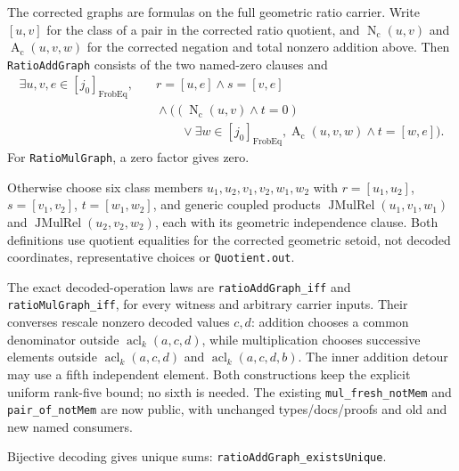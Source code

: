 \documentclass[11pt,oneside]{article}
\theoremstyle{definition}
\theoremstyle{remark}
\newcommand{\acl}{\operatorname{acl}}
\newcommand{\lean}[1]{\nolinkurl{#1}}
\begin{document}
The corrected graphs are formulas on the full geometric ratio carrier.
Write $[u,v]$ for the class of a pair in the corrected ratio quotient, and
$\operatorname{N}_{\mathrm c}(u,v)$ and $\operatorname{A}_{\mathrm c}(u,v,w)$
for the corrected negation and total nonzero addition above. Then
\lean{RatioAddGraph} consists of the two named-zero clauses and
\[
\begin{split}
\exists u,v,e\in[j_0]_{\operatorname{FrobEq}},\quad&
 r=[u,e]\land s=[v,e]\\
&{}\land\bigl((\operatorname{N}_{\mathrm c}(u,v)\land t=0)\\
&\qquad{}\lor\exists w\in[j_0]_{\operatorname{FrobEq}},
       \operatorname{A}_{\mathrm c}(u,v,w)\land t=[w,e]\bigr).
\end{split}
\]
For \lean{RatioMulGraph}, a zero factor gives zero.

Otherwise choose six class members $u_1,u_2,v_1,v_2,w_1,w_2$ with
$r=[u_1,u_2]$, $s=[v_1,v_2]$, $t=[w_1,w_2]$, and generic coupled products
$\operatorname{JMulRel}(u_1,v_1,w_1)$ and
$\operatorname{JMulRel}(u_2,v_2,w_2)$, each with its geometric independence clause.
Both definitions use quotient equalities for the corrected geometric setoid,
not decoded coordinates, representative choices or \lean{Quotient.out}.

The exact decoded-operation laws are \lean{ratioAddGraph_iff} and
\lean{ratioMulGraph_iff}, for every witness and arbitrary carrier inputs.
Their converses rescale nonzero decoded values $c,d$:
addition chooses a common denominator outside $\acl_k(a,c,d)$, while
multiplication chooses successive elements outside $\acl_k(a,c,d)$ and
$\acl_k(a,c,d,b)$. The inner addition detour may use a fifth independent element.
Both constructions keep the explicit uniform rank-five bound; no sixth is needed.
The existing \lean{mul_fresh_notMem} and \lean{pair_of_notMem} are now public,
with unchanged types/docs/proofs and old and new named consumers.

Bijective decoding gives unique sums: \lean{ratioAddGraph_existsUnique}.
\end{document}
